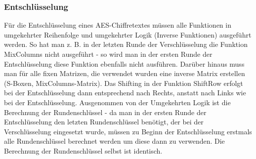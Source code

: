 \documentclass[10pt, a4paper,headsepline]{scrreprt}
\begin{document}
\subsubsection{Entschlüsselung}
Für die Entschlüsselung eines AES-Chiffretextes müssen alle Funktionen in umgekehrter Reihenfolge und umgekehrter Logik (Inverse Funktionen) ausgeführt werden. So hat man z. B. in der letzten Runde der Verschlüsselung die Funktion MixColumns nicht ausgeführt - so wird man in der ersten Runde der Entschlüsselung diese Funktion ebenfalls nicht ausführen. Darüber hinaus muss man für alle fixen Matrizen, die verwendet wurden eine inverse Matrix erstellen (S-Boxen, MixColumns-Matrix). Das Shifting in der Funktion ShiftRow erfolgt bei der Entschlüsselung dann entsprechend nach Rechts, anstatt nach Links wie bei der Entschlüsselung. Ausgenommen von der Umgekehrten Logik ist die Berechnung der Rundenschlüssel - da man in der ersten Runde der Entschlüsselung den letzten Rundenschlüssel benötigt, der bei der Verschlüsselung eingesetzt wurde, müssen zu Beginn der Entschlüsselung erstmals alle Rundenschlüssel berechnet werden um diese dann zu verwenden. Die Berechnung der Rundenschlüssel selbst ist identisch.
\end{document}
